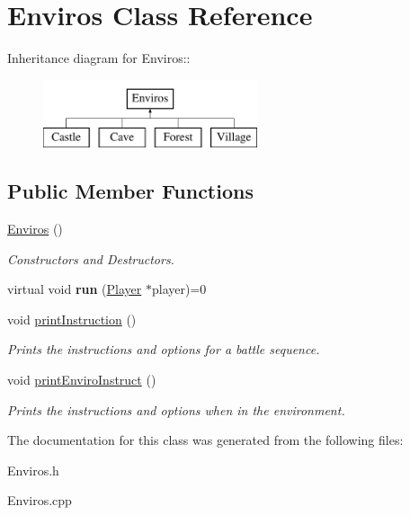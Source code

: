 \hypertarget{classEnviros}{
\section{Enviros Class Reference}
\label{classEnviros}
}
Inheritance diagram for Enviros::\begin{figure}[H]
\begin{center}
\leavevmode
\includegraphics[height=2cm]{classEnviros}
\end{center}
\end{figure}
\subsection*{Public Member Functions}
\begin{DoxyCompactItemize}
\item 
\hypertarget{classEnviros_a92754322cdad0af0e9d74fee0b1b6ce1}{
\hyperlink{classEnviros_a92754322cdad0af0e9d74fee0b1b6ce1}{Enviros} ()}
\label{classEnviros_a92754322cdad0af0e9d74fee0b1b6ce1}

\begin{DoxyCompactList}\small\item\em Constructors and Destructors. \item\end{DoxyCompactList}\item 
\hypertarget{classEnviros_a832d9de2546c75cc92f4fe447f907ece}{
virtual void {\bfseries run} (\hyperlink{classPlayer}{Player} $\ast$player)=0}
\label{classEnviros_a832d9de2546c75cc92f4fe447f907ece}

\item 
\hypertarget{classEnviros_a87473892a35835256edbe83972869a06}{
void \hyperlink{classEnviros_a87473892a35835256edbe83972869a06}{printInstruction} ()}
\label{classEnviros_a87473892a35835256edbe83972869a06}

\begin{DoxyCompactList}\small\item\em Prints the instructions and options for a battle sequence. \item\end{DoxyCompactList}\item 
\hypertarget{classEnviros_aade391c233eb14d53e2db1aca3abe837}{
void \hyperlink{classEnviros_aade391c233eb14d53e2db1aca3abe837}{printEnviroInstruct} ()}
\label{classEnviros_aade391c233eb14d53e2db1aca3abe837}

\begin{DoxyCompactList}\small\item\em Prints the instructions and options when in the environment. \item\end{DoxyCompactList}\end{DoxyCompactItemize}


The documentation for this class was generated from the following files:\begin{DoxyCompactItemize}
\item 
Enviros.h\item 
Enviros.cpp\end{DoxyCompactItemize}
